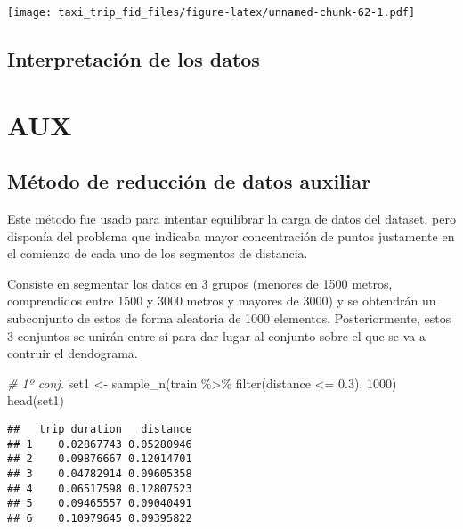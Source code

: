 \documentclass[
]{article}
\newenvironment{Shaded}{\begin{snugshade}}{\end{snugshade}}
\newcommand{\CommentTok}[1]{\textcolor[rgb]{0.56,0.35,0.01}{\textit{#1}}}
\newcommand{\DecValTok}[1]{\textcolor[rgb]{0.00,0.00,0.81}{#1}}
\newcommand{\FloatTok}[1]{\textcolor[rgb]{0.00,0.00,0.81}{#1}}
\newcommand{\FunctionTok}[1]{\textcolor[rgb]{0.00,0.00,0.00}{#1}}
\newcommand{\NormalTok}[1]{#1}
\newcommand{\OtherTok}[1]{\textcolor[rgb]{0.56,0.35,0.01}{#1}}
\newcommand{\SpecialCharTok}[1]{\textcolor[rgb]{0.00,0.00,0.00}{#1}}
\begin{document}
\texttt{[image: taxi\_trip\_fid\_files/figure-latex/unnamed-chunk-62-1.pdf]}

\hypertarget{interpretaciuxf3n-de-los-datos}{%
\subsection{Interpretación de los
datos}\label{interpretaciuxf3n-de-los-datos}}

\hypertarget{aux}{%
\section{AUX}\label{aux}}

\hypertarget{muxe9todo-de-reducciuxf3n-de-datos-auxiliar}{%
\subsection{Método de reducción de datos
auxiliar}\label{muxe9todo-de-reducciuxf3n-de-datos-auxiliar}}

Este método fue usado para intentar equilibrar la carga de datos del
dataset, pero disponía del problema que indicaba mayor concentración de
puntos justamente en el comienzo de cada uno de los segmentos de
distancia.

Consiste en segmentar los datos en 3 grupos (menores de 1500 metros,
comprendidos entre 1500 y 3000 metros y mayores de 3000) y se obtendrán
un subconjunto de estos de forma aleatoria de 1000 elementos.
Posteriormente, estos 3 conjuntos se unirán entre sí para dar lugar al
conjunto sobre el que se va a contruir el dendograma.

\begin{Shaded}
\begin{Highlighting}[]
\CommentTok{\# 1º conj.}
\NormalTok{set1 }\OtherTok{\textless{}{-}} \FunctionTok{sample\_n}\NormalTok{(train }\SpecialCharTok{\%\textgreater{}\%} \FunctionTok{filter}\NormalTok{(distance }\SpecialCharTok{\textless{}=} \FloatTok{0.3}\NormalTok{), }\DecValTok{1000}\NormalTok{)}
\FunctionTok{head}\NormalTok{(set1)}
\end{Highlighting}
\end{Shaded}

\begin{verbatim}
##   trip_duration   distance
## 1    0.02867743 0.05280946
## 2    0.09876667 0.12014701
## 3    0.04782914 0.09605358
## 4    0.06517598 0.12807523
## 5    0.09465557 0.09040491
## 6    0.10979645 0.09395822
\end{verbatim}
\end{document}
